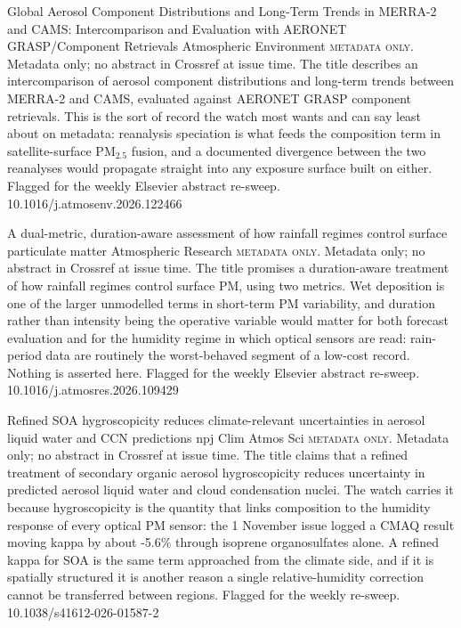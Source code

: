 \documentclass[10pt]{article}
\begin{document}
{Global Aerosol Component Distributions and Long-Term Trends in MERRA-2 and CAMS: Intercomparison and Evaluation with AERONET GRASP/Component Retrievals}
{Atmospheric Environment}
{\textsc{metadata only.} Metadata only; no abstract in Crossref at issue time. The title describes an intercomparison of aerosol component distributions and long-term trends between MERRA-2 and CAMS, evaluated against AERONET GRASP component retrievals. This is the sort of record the watch most wants and can say least about on metadata: reanalysis speciation is what feeds the composition term in satellite-surface PM$_{2.5}$ fusion, and a documented divergence between the two reanalyses would propagate straight into any exposure surface built on either. Flagged for the weekly Elsevier abstract re-sweep.}
{10.1016/j.atmosenv.2026.122466}

{A dual-metric, duration-aware assessment of how rainfall regimes control surface particulate matter}
{Atmospheric Research}
{\textsc{metadata only.} Metadata only; no abstract in Crossref at issue time. The title promises a duration-aware treatment of how rainfall regimes control surface PM, using two metrics. Wet deposition is one of the larger unmodelled terms in short-term PM variability, and duration rather than intensity being the operative variable would matter for both forecast evaluation and for the humidity regime in which optical sensors are read: rain-period data are routinely the worst-behaved segment of a low-cost record. Nothing is asserted here. Flagged for the weekly Elsevier abstract re-sweep.}
{10.1016/j.atmosres.2026.109429}

{Refined SOA hygroscopicity reduces climate-relevant uncertainties in aerosol liquid water and CCN predictions}
{npj Clim Atmos Sci}
{\textsc{metadata only.} Metadata only; no abstract in Crossref at issue time. The title claims that a refined treatment of secondary organic aerosol hygroscopicity reduces uncertainty in predicted aerosol liquid water and cloud condensation nuclei. The watch carries it because hygroscopicity is the quantity that links composition to the humidity response of every optical PM sensor: the 1 November issue logged a CMAQ result moving kappa by about -5.6\% through isoprene organosulfates alone. A refined kappa for SOA is the same term approached from the climate side, and if it is spatially structured it is another reason a single relative-humidity correction cannot be transferred between regions. Flagged for the weekly re-sweep.}
{10.1038/s41612-026-01587-2}
\end{document}

